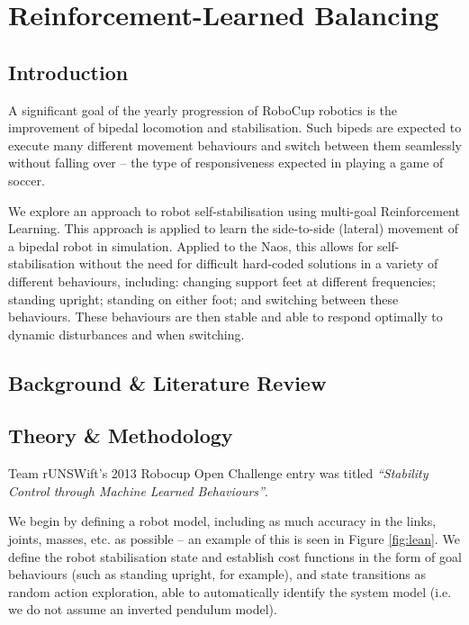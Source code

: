 \chapter{Reinforcement-Learned Balancing}
\label{chap:ns}

\section{Introduction}
A significant goal of the yearly progression of RoboCup robotics is the improvement of bipedal locomotion and stabilisation. Such bipeds are expected to execute many different movement behaviours and switch between them seamlessly without falling over -- the type of responsiveness expected in playing a game of soccer. 

We explore an approach to robot self-stabilisation using multi-goal Reinforcement Learning. This approach is applied to learn the side-to-side (lateral) movement of a bipedal robot in simulation. Applied to the Naos, this allows for self-stabilisation without the need for difficult hard-coded solutions in a variety of different behaviours, including: changing support feet at different frequencies; standing upright; standing on either foot; and switching between these behaviours. These behaviours are then stable and able to respond optimally to dynamic disturbances and when switching.

\section{Background \& Literature Review}

\section{Theory \& Methodology}

Team rUNSWift's 2013 Robocup Open Challenge entry was titled \textit{``Stability Control through Machine Learned Behaviours''}\cite{openchallenge}.

We begin by defining a robot model, including as much accuracy in the links, joints, masses, etc. as possible -- an example of this is seen in Figure \ref{fig:lean}. We define the robot stabilisation state and establish cost functions in the form of goal behaviours (such as standing upright, for example), and state transitions as random action exploration, able to automatically identify the system model (i.e. we do not assume an inverted pendulum model). 

